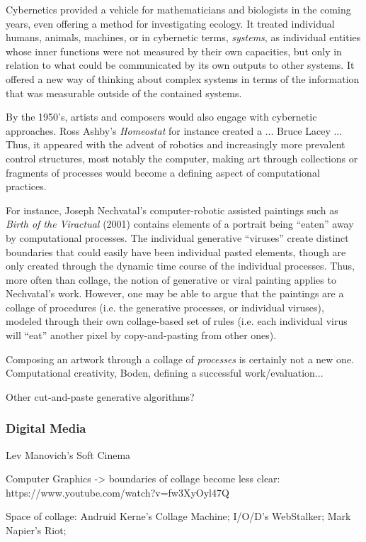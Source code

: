 \documentclass[a4paper,10pt,final]{ThesisStyle}
\begin{document}
Cybernetics provided a vehicle for mathematicians and biologists in the coming years, even offering a method for investigating ecology.  It treated individual humans, animals, machines, or in cybernetic terms, \textit{systems}, as individual entities whose inner functions were not measured by their own capacities, but only in relation to what could be communicated by its own outputs to other systems.  It offered a new way of thinking about complex systems in terms of the information that was measurable outside of the contained systems.  

By the 1950's, artists and composers would also engage with cybernetic approaches.  Ross Ashby's \textit{Homeostat} for instance created a ... Bruce Lacey ... Thus, it appeared with the advent of robotics and increasingly more prevalent control structures, most notably the computer, making art through collections or fragments of processes would become a defining aspect of computational practices.

For instance, Joseph Nechvatal's computer-robotic assisted paintings such as \textit{Birth of the Viractual} (2001) contains elements of a portrait being ``eaten'' away by computational processes.  The individual generative ``viruses'' create distinct boundaries that could easily have been individual pasted elements, though are only created through the dynamic time course of the individual processes.  Thus, more often than collage, the notion of generative or viral painting applies to Nechvatal's work.  However, one may be able to argue that the paintings are a collage of procedures (i.e. the generative processes, or individual viruses), modeled through their own collage-based set of rules (i.e. each individual virus will ``eat'' another pixel by copy-and-pasting from other ones).  

Composing an artwork through a collage of \textit{processes} is certainly not a new one.  
Computational creativity, Boden, defining a successful work/evaluation... 

Other cut-and-paste generative algorithms?

\subsubsection{Digital Media}

Lev Manovich's Soft Cinema

Computer Graphics -> boundaries of collage become less clear: https://www.youtube.com/watch?v=fw3XyOyl47Q

Space of collage: Andruid Kerne's Collage Machine; I/O/D's WebStalker; Mark Napier's Riot; 
\end{document}
